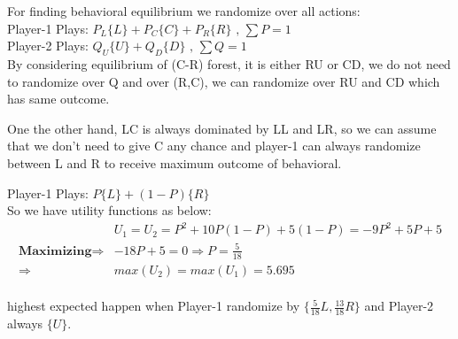 \documentclass[
  course = {{IE579 Game Theory and Multi-Agent Reinforcement Learning}},
  quartile = {{4}},
  assignment = 2,
  name = {{Mohammad Mahdi Rahimi}},
  studentnumber = {{20208244}},
  email = {{mahi@kaist.ac.kr}},
  firstexercise = 1
]{aga-homework}
\begin{document}
For finding behavioral equilibrium we randomize over all actions:\\
Player-1 Plays: $P_L\{L\} + P_C\{C\} + P_R\{R\} \text{ ,  } \sum{P} = 1$\\
Player-2 Plays: $Q_U\{U\} + Q_D\{D\} \text{ ,  } \sum{Q} = 1$\\

By considering equilibrium of (C-R) forest, it is either RU or CD, we do not need to randomize over Q and over (R,C), we can randomize over RU and CD which has same outcome.

One the other hand, LC is always dominated by LL and LR, so we can assume that we don't need to give C any chance and player-1 can always randomize between L and R to receive maximum outcome of behavioral. 

Player-1 Plays: $P\{L\} + (1 -P)\{R\}$\\

So we have utility functions as below:
\begin{equation} \label{eq1}
\begin{split}
& U_1 = U_2 = P^2 + 10P(1-P) + 5(1-P) = -9P^2 + 5P + 5 \\
\textbf{Maximizing} \Rightarrow & -18P + 5 = 0 \Rightarrow P = \frac{5}{18}\\
\Rightarrow & max(U_2) = max(U_1) = 5.695
\end{split}
\end{equation}\\
highest expected happen when Player-1 randomize by $\{\frac{5}{18}L, \frac{13}{18}R\}$ and Player-2 always $\{U\}$.
\end{document}
